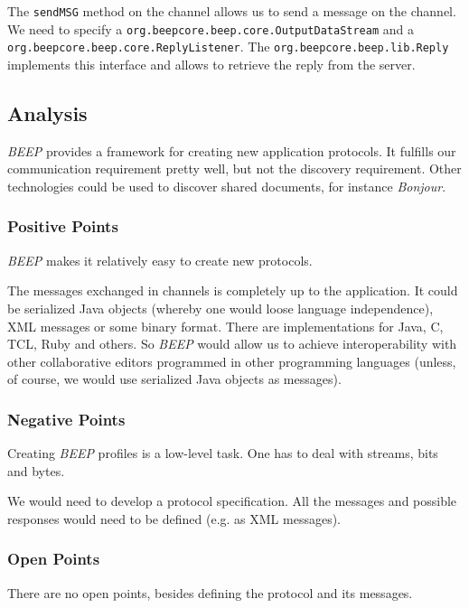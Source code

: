 The \texttt{sendMSG} method on the channel allows us to send a message on the channel. We need to specify a \texttt{org.beepcore.beep.core.OutputDataStream} and a \texttt{org.beepcore.beep.core.ReplyListener}. The \texttt{org.beepcore.beep.lib.Reply} implements this interface and allows to retrieve the reply from the server.



\subsection{Analysis}
\emph{BEEP} provides a framework for creating new application protocols. It fulfills our communication requirement pretty well, but not the discovery requirement. Other technologies could be used to discover shared documents, for instance \emph{Bonjour}.

\subsubsection{Positive Points}
\emph{BEEP} makes it relatively easy to create new protocols.

The messages exchanged in channels is completely up to the application. It could be serialized Java objects (whereby one would loose language independence), XML messages or some binary format. There are implementations for Java, C, TCL, Ruby and others. So \emph{BEEP} would allow us to achieve interoperability with other collaborative editors programmed in other programming languages (unless, of course, we would use serialized Java objects as messages).

\subsubsection{Negative Points}
Creating \emph{BEEP} profiles is a low-level task. One has to deal with streams, bits and bytes. 

We would need to develop a protocol specification. All the messages and possible responses would need to be defined (e.g. as XML messages).

\subsubsection{Open Points}
There are no open points, besides defining the protocol and its messages.




